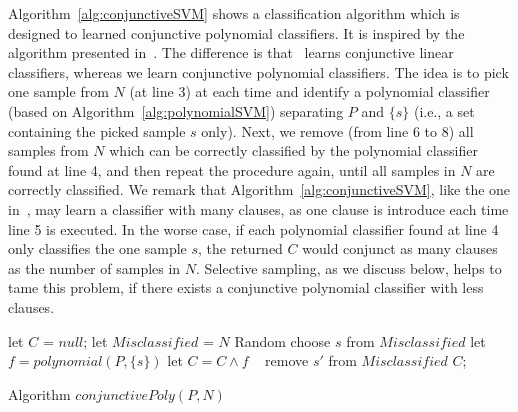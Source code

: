 Algorithm~\ref{alg:conjunctiveSVM} shows a classification algorithm which is designed to learned conjunctive polynomial classifiers.
It is inspired by the algorithm presented in~\cite{sharma2012interpolants}. The difference is that~\cite{sharma2012interpolants} learns conjunctive linear classifiers, whereas we learn conjunctive polynomial classifiers. The idea is to pick one sample from $N$ (at line 3) at each time and identify a polynomial classifier (based on Algorithm~\ref{alg:polynomialSVM}) separating $P$ and $\{s\}$ (i.e., a set containing the picked sample $s$ only). Next, we remove (from line 6 to 8) all samples from $N$ which can be correctly classified by the polynomial classifier found at line 4, and then repeat the procedure again, until all samples in $N$ are correctly classified.
We remark that Algorithm~\ref{alg:conjunctiveSVM}, like the one in~\cite{sharma2012interpolants}, may learn a classifier with many clauses, as one clause is introduce each time line 5 is executed. In the worse case, if each polynomial classifier found at line 4 only classifies the one sample $s$, the returned $C$ would conjunct as many clauses as the number of samples in $N$. Selective sampling, as we discuss below, helps to tame this problem, if there exists a conjunctive polynomial classifier with less clauses.

\begin{algorithm}[t]
\SetAlgoVlined
\Indm
\Indp
    let $C$ = $null$; let $\mathit{Misclassified}$ = $N$\;
     {
        Random choose $s$ from $\mathit{Misclassified}$\;
        let $f = \mathit{polynomial}(P, \{s\})$\;
        let $C = C \land f$\;
         {\
             {
                remove $s'$ from $\mathit{Misclassified}$\;
            }
        }
    }
    \Return $C$;
\caption{Algorithm $\mathit{conjunctivePoly}(P, N)$}
\label{alg:conjunctiveSVM}
\end{algorithm}



